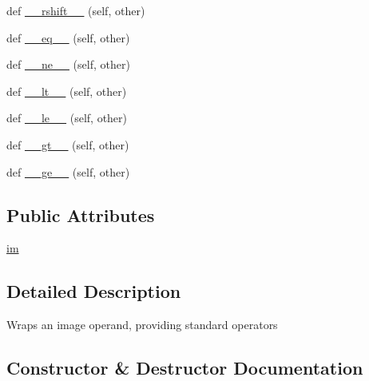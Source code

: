 \begin{DoxyCompactItemize}
\item 
def \hyperlink{classPIL_1_1ImageMath_1_1__Operand_a379ec9de021f9d089ef0bd81784f99d6}{\+\_\+\+\_\+rshift\+\_\+\+\_\+} (self, other)
\item 
def \hyperlink{classPIL_1_1ImageMath_1_1__Operand_a686ce98bb3af43913e58a140ea9b08e7}{\+\_\+\+\_\+eq\+\_\+\+\_\+} (self, other)
\item 
def \hyperlink{classPIL_1_1ImageMath_1_1__Operand_a1bb29b7e43772f4d495f2d11c6250d38}{\+\_\+\+\_\+ne\+\_\+\+\_\+} (self, other)
\item 
def \hyperlink{classPIL_1_1ImageMath_1_1__Operand_af3bdf7f1eb0f5f272f7be3d1f5ecec68}{\+\_\+\+\_\+lt\+\_\+\+\_\+} (self, other)
\item 
def \hyperlink{classPIL_1_1ImageMath_1_1__Operand_a376833de4fbb0d43b0256590340176ed}{\+\_\+\+\_\+le\+\_\+\+\_\+} (self, other)
\item 
def \hyperlink{classPIL_1_1ImageMath_1_1__Operand_ab2fc5b6f4943090490ae01dc690af03c}{\+\_\+\+\_\+gt\+\_\+\+\_\+} (self, other)
\item 
def \hyperlink{classPIL_1_1ImageMath_1_1__Operand_a975e412cebf5cd02b6633b127ac99097}{\+\_\+\+\_\+ge\+\_\+\+\_\+} (self, other)
\end{DoxyCompactItemize}
\subsection*{Public Attributes}
\begin{DoxyCompactItemize}
\item 
\hyperlink{classPIL_1_1ImageMath_1_1__Operand_a2ce3cb32228ab976e70061bd3b94f1e0}{im}
\end{DoxyCompactItemize}


\subsection{Detailed Description}
\begin{DoxyVerb}Wraps an image operand, providing standard operators\end{DoxyVerb}
 

\subsection{Constructor \& Destructor Documentation}
\mbox{\label{classPIL_1_1ImageMath_1_1__Operand_ab20750e1b6cfe98ca715cc67f0209b0a}} 
